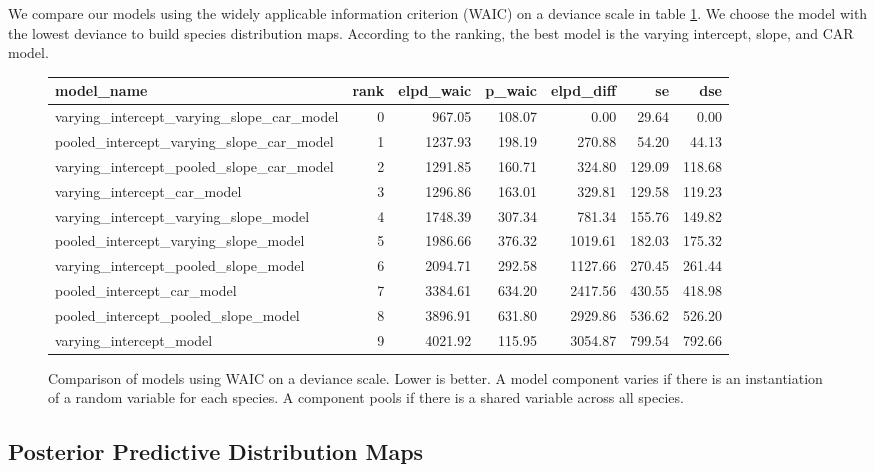 \documentclass[notitlepage]{article}
\begin{document}
We compare our models using the widely applicable information criterion (WAIC) on a deviance scale in table \ref{table:waic_comparison}.
We choose the model with the lowest deviance to build species distribution maps.
According to the ranking, the best model is the varying intercept, slope, and CAR model.

\begin{figure}[H]
\centering
\begin{tabular}{lrrrrrr}
\toprule
model\_name &  rank &  elpd\_waic &  p\_waic &  elpd\_diff &      se &     dse \\
\midrule
varying\_intercept\_varying\_slope\_car\_model &     0 &     967.05 &  108.07 &       0.00 &   29.64 &    0.00 \\
pooled\_intercept\_varying\_slope\_car\_model  &     1 &    1237.93 &  198.19 &     270.88 &   54.20 &   44.13 \\
varying\_intercept\_pooled\_slope\_car\_model  &     2 &    1291.85 &  160.71 &     324.80 &  129.09 &  118.68 \\
varying\_intercept\_car\_model                   &     3 &    1296.86 &  163.01 &     329.81 &  129.58 &  119.23 \\
varying\_intercept\_varying\_slope\_model     &     4 &    1748.39 &  307.34 &     781.34 &  155.76 &  149.82 \\
pooled\_intercept\_varying\_slope\_model      &     5 &    1986.66 &  376.32 &    1019.61 &  182.03 &  175.32 \\
varying\_intercept\_pooled\_slope\_model      &     6 &    2094.71 &  292.58 &    1127.66 &  270.45 &  261.44 \\
pooled\_intercept\_car\_model                    &     7 &    3384.61 &  634.20 &    2417.56 &  430.55 &  418.98 \\
pooled\_intercept\_pooled\_slope\_model       &     8 &    3896.91 &  631.80 &    2929.86 &  536.62 &  526.20 \\
varying\_intercept\_model                       &     9 &    4021.92 &  115.95 &    3054.87 &  799.54 &  792.66 \\
\bottomrule
\end{tabular}
\caption{Comparison of models using WAIC on a deviance scale. Lower is better. A model component varies if there is an instantiation of a random variable for each species. A component pools if there is a shared variable across all species.}
\label{table:waic_comparison}
\end{figure}

\subsection{Posterior Predictive Distribution Maps}
\end{document}
